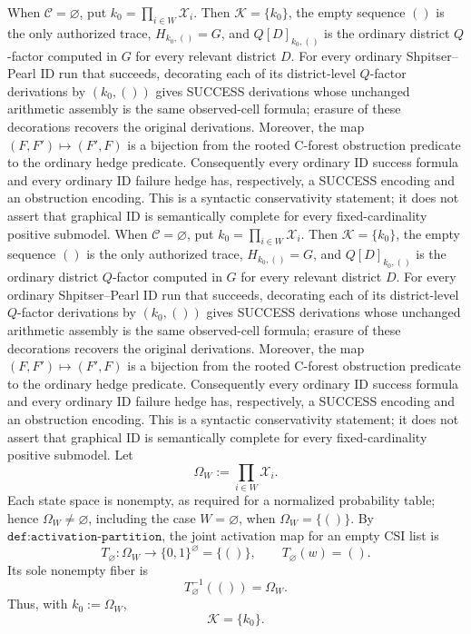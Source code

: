 When \(\mathcal C=\varnothing\), put \(k_0=\prod_{i\in W}\mathcal X_i\). Then \(\mathcal K=\{k_0\}\), the empty sequence \(()\) is the only authorized trace, \(H_{k_0,()}=G\), and \(Q[D]_{k_0,()}\) is the ordinary district \(Q\)-factor computed in \(G\) for every relevant district \(D\). For every ordinary Shpitser--Pearl \(\mathrm{ID}\) run that succeeds, decorating each of its district-level \(Q\)-factor derivations by \((k_0,())\) gives SUCCESS derivations whose unchanged arithmetic assembly is the same observed-cell formula; erasure of these decorations recovers the original derivations. Moreover, the map \((F,F')\mapsto(F',F)\) is a bijection from the rooted C-forest obstruction predicate to the ordinary hedge predicate. Consequently every ordinary \(\mathrm{ID}\) success formula and every ordinary \(\mathrm{ID}\) failure hedge has, respectively, a SUCCESS encoding and an obstruction encoding. This is a syntactic conservativity statement; it does not assert that graphical \(\mathrm{ID}\) is semantically complete for every fixed-cardinality positive submodel.
When \(\mathcal C=\varnothing\), put \(k_0=\prod_{i\in W}\mathcal X_i\). Then \(\mathcal K=\{k_0\}\), the empty sequence \(()\) is the only authorized trace, \(H_{k_0,()}=G\), and \(Q[D]_{k_0,()}\) is the ordinary district \(Q\)-factor computed in \(G\) for every relevant district \(D\). For every ordinary Shpitser--Pearl \(\mathrm{ID}\) run that succeeds, decorating each of its district-level \(Q\)-factor derivations by \((k_0,())\) gives SUCCESS derivations whose unchanged arithmetic assembly is the same observed-cell formula; erasure of these decorations recovers the original derivations. Moreover, the map \((F,F')\mapsto(F',F)\) is a bijection from the rooted C-forest obstruction predicate to the ordinary hedge predicate. Consequently every ordinary \(\mathrm{ID}\) success formula and every ordinary \(\mathrm{ID}\) failure hedge has, respectively, a SUCCESS encoding and an obstruction encoding. This is a syntactic conservativity statement; it does not assert that graphical \(\mathrm{ID}\) is semantically complete for every fixed-cardinality positive submodel.
Let
\[
  \Omega_W:=\prod_{i\in W}\mathcal X_i .
\]
Each state space is nonempty, as required for a normalized probability table; hence \(\Omega_W\neq\varnothing\), including the case \(W=\varnothing\), when \(\Omega_W=\{()\}\).  By \(\texttt{def:activation-partition}\), the joint activation map for an empty CSI list is
\[
  T_{\varnothing}:\Omega_W\longrightarrow \{0,1\}^{\varnothing}=\{()\},
  \qquad T_{\varnothing}(w)=().
\]
Its sole nonempty fiber is
\[
  T_{\varnothing}^{-1}(())=\Omega_W.
\]
Thus, with \(k_0:=\Omega_W\),
\[
  \mathcal K=\{k_0\}.
\]

